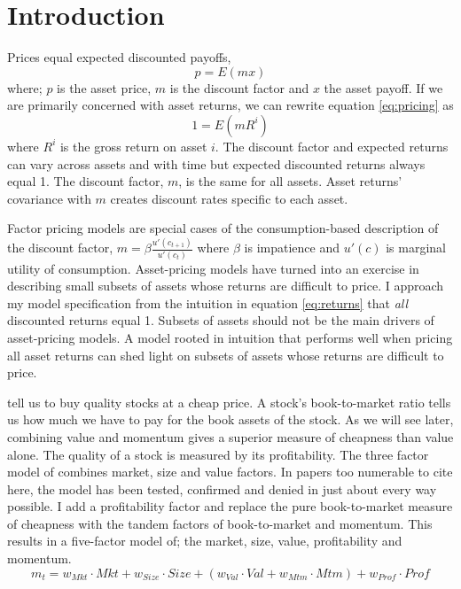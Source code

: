 
\section{Introduction}

Prices equal expected discounted payoffs,
\begin{equation}
\label{eq:pricing}
p=E(mx)
\end{equation}
where; $p$ is the asset price, $m$ is the discount factor and $x$ the asset 
payoff.
If we are primarily concerned with asset returns, we can rewrite equation
\ref{eq:pricing} as
\begin{equation}
\label{eq:returns}
1=E(mR^i)
\end{equation}
where $R^i$ is the gross return on asset $i$.
The discount factor and expected returns can vary across assets and with time 
but expected discounted returns always equal 1.
The discount factor, $m$, is the same for all assets.
Asset returns' covariance with $m$ creates discount rates specific to each 
asset.

Factor pricing models are special cases of the consumption-based description 
of the discount factor, $m=\beta\frac{u'(c_{t+1})}{u'(c_t)}$ where $\beta$ is 
impatience and $u'(c)$ is marginal utility of consumption.
Asset-pricing models have turned into an exercise in describing small subsets 
of assets whose returns are difficult to price.
I approach my model specification from the intuition in equation 
\ref{eq:returns} that \emph{all} discounted returns equal 1.
Subsets of assets should not be the main drivers of asset-pricing models.
A model rooted in intuition that performs well when pricing all asset returns 
can shed light on subsets of assets whose returns are difficult to price.

\cite{graham1934security} tell us to buy quality stocks at a cheap price.
A stock's book-to-market ratio tells us how much we have to pay for the book 
assets of the stock.
As we will see later, combining value and momentum gives a superior measure of 
cheapness than value alone.
The quality of a stock is measured by its profitability.
The three factor model of \cite{fama1993common} combines market, size and 
value factors.
In papers too numerable to cite here, the model has been tested, confirmed and 
denied in just about every way possible.
I add a profitability factor and replace the pure book-to-market measure of 
cheapness with the tandem factors of book-to-market and momentum.
This results in a five-factor model of; the market, size, value, profitability 
and momentum.
\begin{equation}
\label{eq:model}
m_t= w_{Mkt} \cdot Mkt + w_{Size} \cdot Size +
\left( w_{Val} \cdot Val + w_{Mtm} \cdot Mtm \right) + 
w_{Prof} \cdot Prof
\end{equation}


